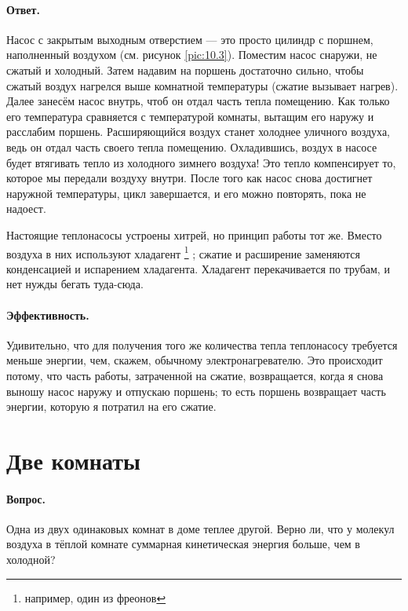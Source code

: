 \paragraph{Ответ.}
Насос с закрытым выходным отверстием --- это просто цилиндр с поршнем, наполненный воздухом (см. рисунок \ref{pic:10.3}).
Поместим насос снаружи, не сжатый и холодный.
Затем надавим на поршень достаточно сильно, чтобы сжатый воздух нагрелся выше комнатной температуры (сжатие вызывает нагрев).
Далее занесём насос внутрь, чтоб он отдал часть тепла помещению.
Как только его температура сравняется с температурой комнаты, вытащим его наружу и расслабим поршень.
Расширяющийся воздух станет холоднее уличного воздуха, ведь он отдал часть своего тепла помещению.
Охладившись, воздух в насосе будет втягивать тепло из холодного зимнего воздуха!
Это тепло компенсирует то, которое мы передали воздуху внутри.
После того как насос снова достигнет наружной температуры, цикл завершается, и его можно повторять, пока не надоест.

Настоящие теплонасосы устроены хитрей, но принцип работы тот же.
Вместо воздуха в них используют хладагент%
\footnote{например, один из фреонов \pr}%
; сжатие и расширение заменяются конденсацией и испарением хладагента.
Хладагент перекачивается по трубам, и нет нужды бегать туда-сюда.

\paragraph{Эффективность.}
Удивительно, что для получения того же количества тепла теплонасосу требуется меньше энергии, чем, скажем, обычному электронагревателю.
Это происходит потому, что часть работы, затраченной на сжатие, возвращается, когда я снова выношу насос наружу и отпускаю поршень; то есть поршень возвращает часть энергии, которую я потратил на его сжатие.

\section{Две комнаты}

\paragraph{Вопрос.}
Одна из двух одинаковых комнат в доме теплее другой.
Верно ли, что у молекул воздуха в тёплой комнате
суммарная кинетическая энергия больше, чем в холодной?

